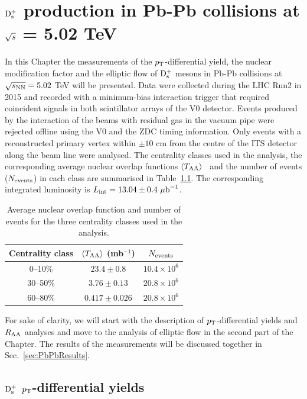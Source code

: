 \chapter{${\rm D_s^+}$ production in Pb-Pb collisions at $\sqrt{s}$ = 5.02 TeV}
\label{chap:PbPb}
In this Chapter the measurements of the $p_{\rm T}$-differential yield,
the nuclear modification factor and the elliptic flow of ${\rm D_s^+}$ mesons
in Pb-Pb collisions at $\sqrt{s_{\rm NN}} = 5.02$ TeV will be presented. Data were
collected during the LHC Run2 in 2015 and recorded with a 
minimum-bias interaction trigger that required coincident signals in 
both scintillator arrays of the V0 detector. Events produced by 
the interaction of the beams with residual gas in the
vacuum pipe were rejected offline using the V0 and the ZDC 
timing information. Only events with a reconstructed primary vertex 
within $\pm 10$ cm from the centre of the ITS detector along
the beam line were analysed. The centrality classes 
used in the analysis, the corresponding 
average nuclear overlap functions $\left\langle T_{\rm AA} \right\rangle$~\cite{ALICE-PUBLIC-2015-008} 
and the number of events ($N_{\rm events}$) in each class 
are summarised in Table~\ref{tab:Nevents}. The corresponding 
integrated luminosity is $L_{\rm int}=13.04\pm0.4~\mathrm{\mu b}^{-1}$.\\
\begin{table}[!h]
	\centering
	\begin{tabular}{ccc}
	\hline
	Centrality class & $\langle T_{\rm AA}\rangle$ (mb$^{-1}$)& $N_{\rm events}$\\
	\hline
	\phantom{0}0--10\% & $23.4\pm0.8$ & $10.4 \times 10^6$ \\
	30--50\% & $3.76\pm0.13$ & $20.8 \times 10^6$\\
	60--80\% & $0.417 \pm 0.026$ & $20.8 \times 10^6$\\
	\hline
	\end{tabular}		
	\caption{Average nuclear overlap function and number of events  for the three centrality classes used in the analysis.}
	\label{tab:Nevents}
\end{table}

For sake of clarity, we will start with the description of $p_{\rm T}$-differential yields and $R_{\rm AA}$ 
analyses and move to the analysis of elliptic flow in the second part of the Chapter. 
The results of the measurements will be discussed together in Sec.~\ref{sec:PbPbResults}.

\section{${\rm D_s^+}$ $p_{\rm T}$-differential yields}
\label{sec:YieldsAndRaa}
